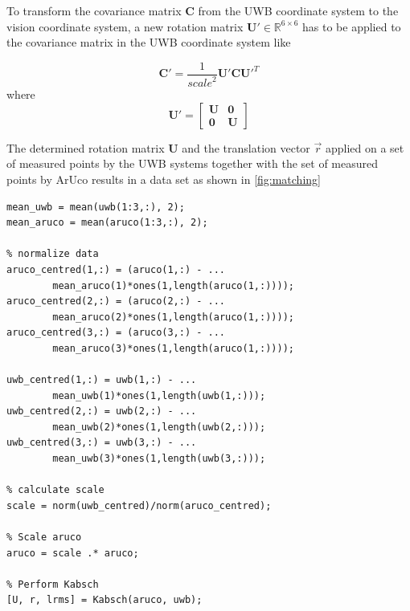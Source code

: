 To transform the covariance matrix $\textbf{C}$ from the \ac{UWB} coordinate system to the vision coordinate system, a new rotation matrix $\textbf{U}' \in \mathbb{R}^{6\times6}$ has to be applied to the covariance matrix in the \ac{UWB} coordinate system like

\begin{equation}
	\textbf{C}' = \frac{1}{\mathit{scale}^2} \textbf{U}' \textbf{C} \textbf{U}'^T
\end{equation}
where
\begin{equation}
	\textbf{U}' =
	\begin{bmatrix}
		\textbf{U} & \textbf{0} \\
		\textbf{0} & \textbf{U}
	\end{bmatrix}
\end{equation}

The determined rotation matrix $\textbf{U}$ and the translation vector $\vec r$ applied on a set of measured points by the \ac{UWB} systems together with the set of measured points by ArUco results in a data set as shown in \autoref{fig:matching}

\lstset{language=Matlab}
\begin{lstlisting}[frame=single, caption=Matching proceeder, label=lst:matching]
% Calculate mean
mean_uwb = mean(uwb(1:3,:), 2);
mean_aruco = mean(aruco(1:3,:), 2);
	
% normalize data	
aruco_centred(1,:) = (aruco(1,:) - ...
		mean_aruco(1)*ones(1,length(aruco(1,:))));
aruco_centred(2,:) = (aruco(2,:) - ...
		mean_aruco(2)*ones(1,length(aruco(1,:))));
aruco_centred(3,:) = (aruco(3,:) - ...
		mean_aruco(3)*ones(1,length(aruco(1,:))));

uwb_centred(1,:) = uwb(1,:) - ...
		mean_uwb(1)*ones(1,length(uwb(1,:)));
uwb_centred(2,:) = uwb(2,:) - ...
		mean_uwb(2)*ones(1,length(uwb(2,:)));
uwb_centred(3,:) = uwb(3,:) - ...
		mean_uwb(3)*ones(1,length(uwb(3,:)));
	
% calculate scale
scale = norm(uwb_centred)/norm(aruco_centred);

% Scale aruco	
aruco = scale .* aruco;	
	
% Perform Kabsch
[U, r, lrms] = Kabsch(aruco, uwb);
\end{lstlisting}



